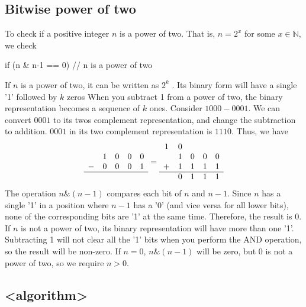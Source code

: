\documentclass{report}
\begin{document}
\subsection{Bitwise power of two}
\bigbreak \noindent 
To check if a positive integer $n$ is a power of two. That is, $n = 2^{x}$ for some $x\in\mathbb{N}$, we check
\bigbreak \noindent 
\begin{cppcode}
    if (n & n-1 == 0) {
        // n is a power of two
    }
\end{cppcode}
\bigbreak \noindent 
If $n$ is a power of two, it can be written as $2^{k}$ . Its binary form will have a single '1' followed by $k$ zeros
\bigbreak \noindent 
When you subtract 1 from a power of two, the binary representation becomes a sequence of $k$ ones.
\bigbreak \noindent 
Consider $1000 - 0001$. We can convert $0001$ to its twos complement representation, and change the subtraction to addition. $0001$ in its two complement representation is $1110$. Thus, we have
\begin{align*}
    \begin{array}{ccccc} &1&0&0&0 \\ -&0&0&0&1 \\ \hline \end{array} = \begin{array}{ccccc} 1 & 0 & & & \\ & 1 & 0 & 0 & 0 \\ +&1&1&1&1 \\ \hline &0&1&1&1 \end{array}
\end{align*}
\bigbreak \noindent 
The operation $n\&(n-1)$ compares each bit of $n$ and $n-1$. Since $n$ has a single '1' in a position where $n-1$ has a '0' (and vice versa for all lower bits), none of the corresponding bits are '1' at the same time. Therefore, the result is 0.
\bigbreak \noindent 
If $n $ is not a power of two, its binary representation will have more than one '1'. Subtracting 1 will not clear all the '1' bits when you perform the AND operation, so the result will be non-zero.
\bigbreak \noindent 
If $n =0$, $n \& (n-1)$ will be zero, but $0$ is not a power of two, so we require $n >0$.

\pagebreak 
{}
\bigbreak \noindent 


\pagebreak 
{}
\bigbreak \noindent 
\subsection{<algorithm>}
\bigbreak \noindent 
\end{document}
